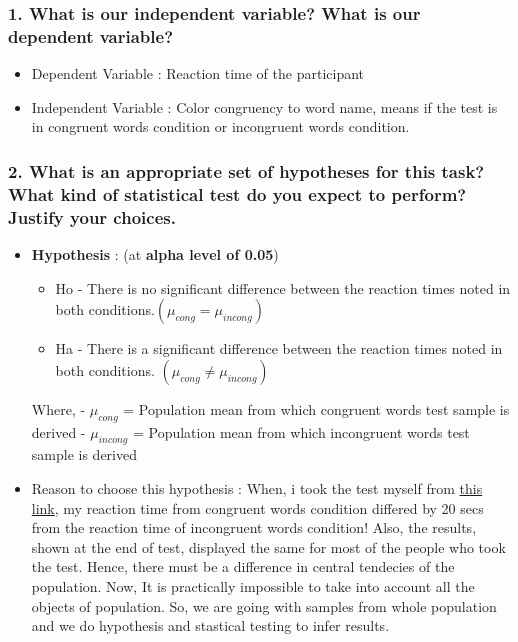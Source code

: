 \documentclass[11pt]{article}
\providecommand{\tightlist}{%
      \setlength{\itemsep}{0pt}\setlength{\parskip}{0pt}}
\begin{document}
    \subsubsection{1. What is our independent variable? What is our
dependent
variable?}\label{what-is-our-independent-variable-what-is-our-dependent-variable}

    \begin{itemize}
\item
  Dependent Variable : Reaction time of the participant
\item
  Independent Variable : Color congruency to word name, means if the
  test is in congruent words condition or incongruent words condition.
\end{itemize}

    \subsubsection{2. What is an appropriate set of hypotheses for this
task? What kind of statistical test do you expect to perform? Justify
your
choices.}\label{what-is-an-appropriate-set-of-hypotheses-for-this-task-what-kind-of-statistical-test-do-you-expect-to-perform-justify-your-choices.}

    \begin{itemize}
\tightlist
\item
  \textbf{Hypothesis} : (at \textbf{alpha level of 0.05})

  \begin{itemize}
  \tightlist
  \item
    Ho - There is no significant difference between the reaction times
    noted in both conditions.\((\mu_{cong} = \mu_{incong})\)
  \item
    Ha - There is a significant difference between the reaction times
    noted in both conditions. \((\mu_{cong} \neq \mu_{incong})\)
  \end{itemize}

  Where, - \(\mu_{cong}\) = Population mean from which congruent words
  test sample is derived - \(\mu_{incong}\) = Population mean from which
  incongruent words test sample is derived
\item
  Reason to choose this hypothesis : When, i took the test myself from
  \href{https://faculty.washington.edu/chudler/java/ready.html}{this
  link}, my reaction time from congruent words condition differed by 20
  secs from the reaction time of incongruent words condition! Also, the
  results, shown at the end of test, displayed the same for most of the
  people who took the test. Hence, there must be a difference in central
  tendecies of the population. Now, It is practically impossible to take
  into account all the objects of population. So, we are going with
  samples from whole population and we do hypothesis and stastical
  testing to infer results.
\end{itemize}
\end{document}

